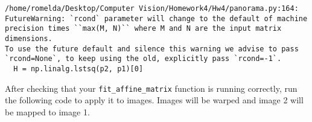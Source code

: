 \documentclass[11pt]{article}
\begin{document}
    \begin{Verbatim}[commandchars=\\\{\}]
/home/romelda/Desktop/Computer Vision/Homework4/Hw4/panorama.py:164: FutureWarning: `rcond` parameter will change to the default of machine precision times ``max(M, N)`` where M and N are the input matrix dimensions.
To use the future default and silence this warning we advise to pass `rcond=None`, to keep using the old, explicitly pass `rcond=-1`.
  H = np.linalg.lstsq(p2, p1)[0]

    \end{Verbatim}

    After checking that your \texttt{fit\_affine\_matrix} function is
running correctly, run the following code to apply it to images. Images
will be warped and image 2 will be mapped to image 1.
\end{document}

